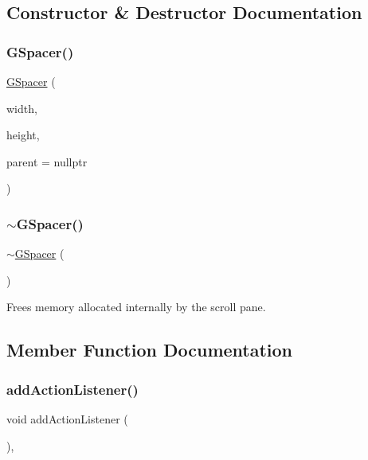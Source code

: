 \subsection{Constructor \& Destructor Documentation}
\mbox{\label{classGSpacer_abbd146cc21cc285a4b4b388dd57b9ffa}} 
\subsubsection{\texorpdfstring{G\+Spacer()}{GSpacer()}}
{\footnotesize\ttfamily \mbox{\hyperlink{classGSpacer}{G\+Spacer}} (\begin{DoxyParamCaption}\item[{double}]{width,  }\item[{double}]{height,  }\item[{Q\+Widget $\ast$}]{parent = {\ttfamily nullptr} }\end{DoxyParamCaption})}

\mbox{\label{classGSpacer_a20f146a52fc612e051e0b8f2cdf18a8d}} 
\subsubsection{\texorpdfstring{$\sim$\+G\+Spacer()}{~GSpacer()}}
{\footnotesize\ttfamily $\sim$\mbox{\hyperlink{classGSpacer}{G\+Spacer}} (\begin{DoxyParamCaption}{ }\end{DoxyParamCaption})\hspace{0.3cm}{\ttfamily [override]}}



Frees memory allocated internally by the scroll pane. 



\subsection{Member Function Documentation}
\mbox{\label{classGInteractor_a02f20ea6edfa0671f31c4c648a253833}} 
\subsubsection{\texorpdfstring{add\+Action\+Listener()}{addActionListener()}}
{\footnotesize\ttfamily void add\+Action\+Listener (\begin{DoxyParamCaption}{ }\end{DoxyParamCaption})\hspace{0.3cm}{\ttfamily [virtual]}, {\ttfamily [inherited]}}



